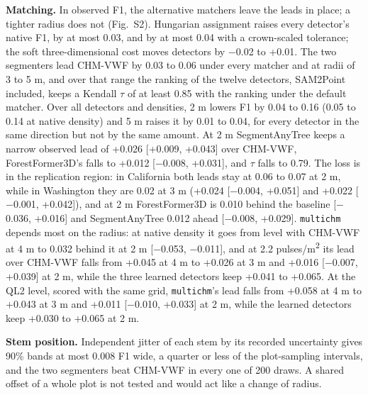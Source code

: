 \documentclass[10pt,a4paper]{article}
\begin{document}
\textbf{Matching.} In observed F1, the alternative matchers leave the leads in place;
a tighter radius does not (Fig.~S2). Hungarian assignment raises every
detector's native F1, by at most 0.03, and by at most 0.04 with a crown-scaled
tolerance; the soft three-dimensional cost moves detectors by $-$0.02 to +0.01.
The two segmenters lead CHM-VWF by 0.03 to 0.06 under every matcher and at radii
of 3 to 5 m, and over that range the ranking of the twelve detectors, SAM2Point
included, keeps a Kendall $\tau$ of at least 0.85 with the ranking under the default
matcher. Over all detectors and densities, 2 m lowers F1 by 0.04 to 0.16 (0.05
to 0.14 at native density) and 5 m raises it by 0.01 to 0.04, for every detector
in the same direction but not by the same amount. At 2 m SegmentAnyTree keeps a
narrow observed lead of +0.026 [+0.009, +0.043] over CHM-VWF, ForestFormer3D's
falls to +0.012 [$-$0.008, +0.031], and $\tau$ falls to 0.79. The loss is in the
replication region: in California both leads stay at 0.06 to 0.07 at 2 m, while
in Washington they are 0.02 at 3 m (+0.024 [$-$0.004, +0.051] and +0.022 [$-$0.001,
+0.042]), and at 2 m ForestFormer3D is 0.010 behind the baseline [$-$0.036,
+0.016] and SegmentAnyTree 0.012 ahead [$-$0.008, +0.029]. \texttt{multichm} depends most
on the radius: at native density it goes from level with CHM-VWF at 4 m to 0.032
behind it at 2 m [$-$0.053, $-$0.011], and at 2.2 pulses/m\textsuperscript{2} its lead over CHM-VWF
falls from +0.045 at 4 m to +0.026 at 3 m and +0.016 [$-$0.007, +0.039] at 2 m,
while the three learned detectors keep +0.041 to +0.065. At the QL2 level,
scored with the same grid, \texttt{multichm}'s lead falls from +0.058 at 4 m to +0.043
at 3 m and +0.011 [$-$0.010, +0.033] at 2 m, while the learned detectors keep
+0.030 to +0.065 at 2 m.

\textbf{Stem position.} Independent jitter of each stem by its recorded uncertainty
gives 90\% bands at most 0.008 F1 wide, a quarter or less of the plot-sampling
intervals, and the two segmenters beat CHM-VWF in every one of 200 draws. A
shared offset of a whole plot is not tested and would act like a change of
radius.
\end{document}
